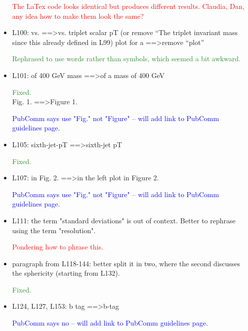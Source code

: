 \documentclass[paper=a4, fontsize=11pt]{scrartcl}
\begin{document}
\begin{itemize}
\textcolor{Red}{The LaTex code looks identical but produces different results. Claudia, Dan, any idea how to make them look the same?}\\

\item L100: 
vs. ==\textgreater vs. triplet scalar pT (or remove “The triplet invariant mass since 
this already defined in L99) 
plot for a ==\textgreater remove “plot” 

\textcolor{ForestGreen}{Rephrased to use words rather than symbols, which seemed a bit awkward.}\\


\item L101: 
of 400 GeV mass ==\textgreater of a mass of 400 GeV 

\textcolor{ForestGreen}{Fixed.}\\

Fig. 1. ==\textgreater Figure 1. 

\textcolor{Blue}{PubComm says use "Fig." not "Figure" -- will add link to PubComm guidelines page.}\\

\item L105: 
sixth-jet-pT ==\textgreater sixth-jet pT 

\textcolor{ForestGreen}{Fixed.}\\

\item L107: 
in Fig. 2. ==\textgreater in the left plot in Figure 2. 

\textcolor{Blue}{PubComm says use "Fig." not "Figure" -- will add link to PubComm guidelines page.}\\


\item L111: 
the term "standard deviations" is out of context. Better to rephrase using 
the term "resolution". 

\textcolor{Red}{Pondering how to phrase this.}\\

\item paragraph from L118-144: 
better split it in two, where the second discusses the sphericity (starting 
from L132). 

\textcolor{ForestGreen}{Fixed.}\\

\item L124, L127, L153: 
b tag ==\textgreater b-tag 

\textcolor{Blue}{PubComm says no -- will add link to PubComm guidelines page.}\\


\end{itemize}
\end{document}
